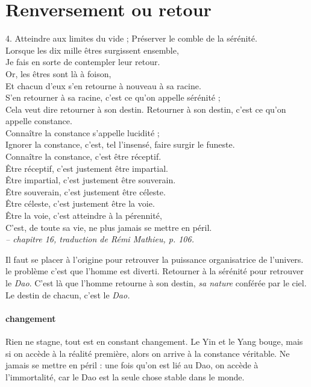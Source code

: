 \section{Renversement ou retour}

\begin{singlequote}
    4.	Atteindre aux limites du vide ; Préserver le comble de la sérénité.\\
Lorsque les dix mille êtres surgissent ensemble, \\Je fais en sorte de contempler leur retour.\\
Or, les êtres sont là à foison,\\
Et chacun d’eux s’en retourne à nouveau à sa racine. \\S’en retourner à sa racine, c’est ce qu’on appelle sérénité ; \\Cela veut dire retourner à son destin.
Retourner à son destin, c’est ce qu’on appelle constance. \\Connaître la constance s’appelle lucidité ;\\
Ignorer la constance, c’est, tel l’insensé, faire surgir le funeste. \\Connaître la constance, c’est être réceptif.\\
Être réceptif, c’est justement être impartial. \\Être impartial, c’est justement être souverain. \\Être souverain, c’est justement être céleste.\\
Être céleste, c’est justement être la voie.\\ Être la voie, c’est atteindre à la pérennité,\\
C’est, de toute sa vie, ne plus jamais se mettre en péril.\\
\textit{ \small -- chapitre 16, traduction de Rémi Mathieu, p. 106.}
\end{singlequote}

Il faut se placer à l'origine pour retrouver la puissance organisatrice de l'univers.
le problème c'est que l'homme est diverti. Retourner à la sérénité pour retrouver le \textit{Dao}. C'est là que l'homme retourne à son destin, \textit{sa nature} conférée par le ciel. Le destin de chacun, c'est le \textit{Dao.}
\paragraph{changement} Rien ne stagne, tout est en constant changement. Le Yin et le Yang bouge, mais si on accède à la réalité première, alors on arrive à la constance véritable. Ne jamais se mettre en péril : une fois qu'on est lié au Dao, on accède à l'immortalité, car le Dao est la seule chose stable dans le monde.

